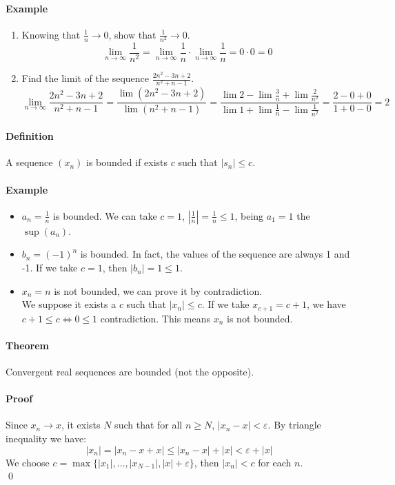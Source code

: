 \documentclass{article}
\newcommand{\abs}[1]{\left|#1\right|}
\newcommand{\limn}{\lim_{n \to \infty}}
\newcommand{\Ep}{\varepsilon}
\newcommand{\Def}{\paragraph{Definition}}
\newcommand{\Theorem}{\paragraph{Theorem}}
\newcommand{\Proof}{\paragraph{Proof}}
\newcommand{\Example}{\paragraph{Example}}
\begin{document}
  \Example
    \begin{enumerate}[label=(\arabic*)]
      \item
      Knowing that $\frac{1}{n} \to 0$, show that $\frac{1}{n^2} \to 0$.
      \begin{equation*}
        \limn \frac{1}{n^2} = \limn \frac{1}{n} \cdot \limn \frac{1}{n} = 0 \cdot 0 = 0
      \end{equation*}

      \item
      Find the limit of the sequence $\frac{2n^2 - 3n + 2}{n^2 + n -1}$.
      \begin{equation*}
        \limn \frac{2n^2 - 3n + 2}{n^2 + n -1} =
        \frac{\lim (2n^2 - 3n + 2)}{\lim (n^2 + n -1)} =
        \frac{\lim 2 - \lim \frac{3}{n} + \lim \frac{2}{n^2}}{\lim 1 +
        \lim \frac{1}{n} - \lim \frac{1}{n^2}} =
        \frac{2 - 0 + 0}{1 + 0 - 0} = 2
      \end{equation*}
    \end{enumerate}

  \Def A sequence $(x_n)$ is bounded if exists $c$ such that $\abs{s_n} \leq c$.

  \Example
  \begin{itemize}
    \item $a_n = \frac{1}{n}$ is bounded. We can take $c = 1$,
    $\abs{\frac{1}{n}} = \frac{1}{n} \leq 1$, being $a_1 = 1$ the $\sup(a_n)$.
    \item $b_n = (-1)^n$ is bounded. In fact, the values of the sequence are
    always 1 and -1. If we take $c = 1$, then $\abs{b_n} = 1 \leq 1$.
    \item $x_n = n$ is not bounded, we can prove it by contradiction.
  \\We suppose it exists a $c$ such that $\abs{x_n} \leq c$. If we take $x_{c+1}
    = c + 1$, we have $c + 1 \leq c \iff 0 \leq 1$ contradiction. This means
    $x_n$ is not bounded.
  \end{itemize}

  \Theorem Convergent real sequences are bounded (not the opposite).

  \Proof Since $x_n \to x$, it exists $N$ such that for all $n \geq N$,
  $\abs{x_n - x} < \Ep$. By triangle inequality we have:
  \begin{equation*}
    \abs{x_n} = \abs{x_n - x + x} \leq \abs{x_n - x} + \abs{x} < \Ep + \abs{x}
  \end{equation*}
  We choose $c = \max\{\abs{x_1}, \hdots, \abs{x_{N-1}}, \abs{x} + \Ep\}$,
  then $\abs{x_n} < c$ for each $n$.
\\\qed
\end{document}

